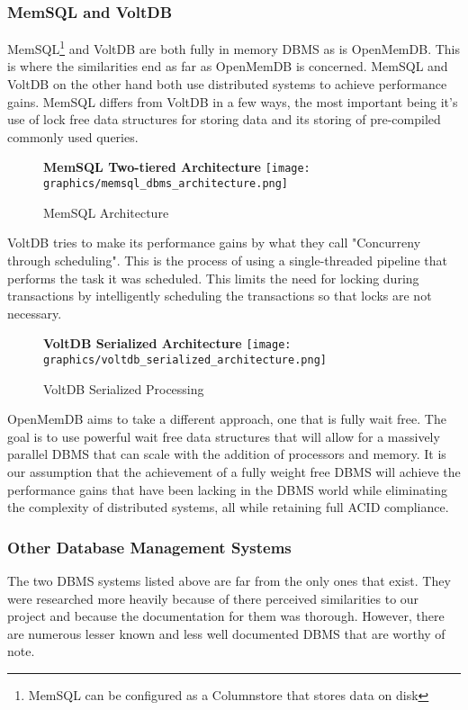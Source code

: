 \documentclass[letterpaper, 12pt]{article}
\begin{document}
\subsubsection{MemSQL and VoltDB}
MemSQL\footnote{MemSQL can be configured as a Columnstore that stores data on disk}
and VoltDB are both fully in memory DBMS as is OpenMemDB. This is where the
similarities end as far as OpenMemDB is concerned. MemSQL and VoltDB on the other 
hand both use distributed systems to achieve performance gains. MemSQL differs from 
VoltDB in a few ways, the most important being it's use of lock free data structures
for storing data and its storing of pre-compiled commonly used queries\cite{MemSQL}.
\begin{figure}
  \centering
  \textbf{MemSQL Two-tiered Architecture}
  \texttt{[image: graphics/memsql\_dbms\_architecture.png]}
  \caption{MemSQL Architecture}
\end{figure}
VoltDB tries to make its performance gains by what they call "Concurreny through
scheduling"\cite{VoltDB}. This is the process of using a single-threaded pipeline 
that performs the task it was scheduled. This limits the need for locking during
transactions by intelligently scheduling the transactions so that locks are not
necessary.
\begin{figure}
  \centering
  \textbf{VoltDB Serialized Architecture}
  \texttt{[image: graphics/voltdb\_serialized\_architecture.png]}
  \caption{VoltDB Serialized Processing}
\end{figure}
\par\vspace{\baselineskip}
OpenMemDB aims to take a different approach, one that is fully wait free. The goal is 
to use powerful wait free data structures that will allow for a massively parallel 
DBMS that can scale with the addition of processors and memory. It is our assumption 
that the achievement of a fully weight free DBMS will achieve the performance gains 
that have been lacking in the DBMS world while eliminating the complexity of 
distributed systems, all while retaining full ACID compliance.

\subsubsection{Other Database Management Systems}
The two DBMS systems listed above are far from the only ones that exist. They were
researched more heavily because of there perceived similarities to our project and
because the documentation for them was thorough. However, there are numerous lesser
known and less well documented DBMS that are worthy of note.
\end{document}
